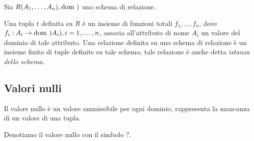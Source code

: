 \begin{definizione}
Sia $R(A_1,\dots,A_n),\text{dom })$ uno schema di relazione.

Una tupla $t$ definita su $R$ è un insieme di funzioni totali $f_1,\dots,f_n$,
dove $f_i:A_i\rightarrow\text{dom })A_i),i=1,\dots,n$, associa all'attributo di nome
$A_i$ un valore del dominio di tale attributo.
Una relazione definita su uno schema di relazione è un insieme finito di tuple
definite su tale schema; tale relazione è anche detta \emph{istanza dello
schema}.
\end{definizione}

\subsection{Valori nulli}%
\label{sub:Valori nulli}
Il valore nullo è un valore ammissibile per ogni dominio, rappresenta la
mancanza di un valore di una tupla.

Denotiamo il valore nullo con il simbolo $?$.
